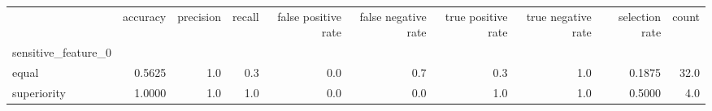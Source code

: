 \begin{tabular}{lrrrrrrrrr}
\toprule
{} &  accuracy &  precision &  recall &  false positive rate &  false negative rate &  true positive rate &  true negative rate &  selection rate &  count \\
sensitive\_feature\_0 &           &            &         &                      &                      &                     &                     &                 &        \\
\midrule
equal               &    0.5625 &        1.0 &     0.3 &                  0.0 &                  0.7 &                 0.3 &                 1.0 &          0.1875 &   32.0 \\
superiority         &    1.0000 &        1.0 &     1.0 &                  0.0 &                  0.0 &                 1.0 &                 1.0 &          0.5000 &    4.0 \\
\bottomrule
\end{tabular}
